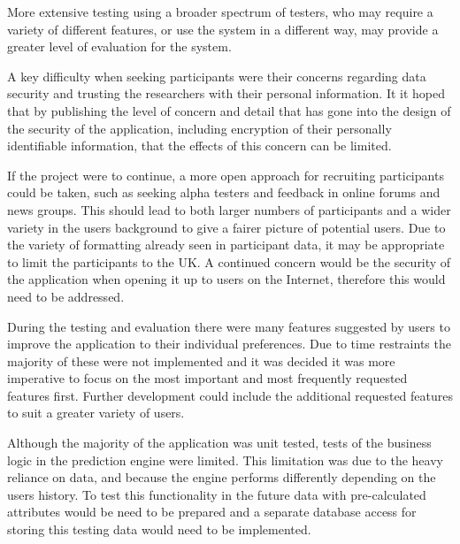 More extensive testing using a broader spectrum of testers, who may require a variety of different features, or use the system in a different way, may provide a greater level of evaluation for the system.

A key difficulty when seeking participants were their concerns regarding data security and trusting the researchers with their personal information. It it hoped that by publishing the level of concern and detail that has gone into the design of the security of the application, including encryption of their personally identifiable information, that the effects of this concern can be limited.

If the project were to continue, a more open approach for recruiting participants could be taken, such as seeking alpha testers and feedback in online forums and news groups. This should lead to both larger numbers of participants and a wider variety in the users background to give a fairer picture of potential users. Due to the variety of formatting already seen in participant data, it may be appropriate to limit the participants to the UK. A continued concern would be the security of the application when opening it up to users on the Internet, therefore this would need to be addressed.

During the testing and evaluation there were many features suggested by users to improve the application to their individual preferences. Due to time restraints the majority of these were not implemented and it was decided it was more imperative to focus on the most important and most frequently requested features first. Further development could include the additional requested features to suit a greater variety of users.

Although the majority of the application was unit tested, tests of the business logic in the prediction engine were limited. This limitation was due to the heavy reliance on data, and because the engine performs differently depending on the users history. To test this functionality in the future data with pre-calculated attributes would be need to be prepared and a separate database access for storing this testing data would need to be implemented.

\begin{comment}
SELECT user_id, MAX(  `dateposted` ) , MIN(  `dateposted` ) , DATEDIFF( MAX(  `dateposted` ) , MIN(  `dateposted` ) ) /30
FROM transaction
GROUP BY  `user_id` 
ORDER BY DATEDIFF( MAX(  `dateposted` ) , MIN(  `dateposted` ) ) ASC 
\end{comment}


